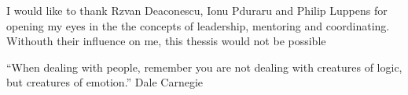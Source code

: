 \vspace*{7cm}
\begin{center}
I would like to thank Rzvan Deaconescu, Ionu Pduraru and Philip Luppens for opening my eyes in the the concepts of leadership, mentoring and coordinating. Withouth their influence on me, this thessis would not be possible
\end{center}
\vspace{0.6cm}
\begin{center}
\begin{displayquote}
``When dealing with people, remember you are not dealing with creatures of logic, but creatures of emotion.'' Dale Carnegie
\end{displayquote}
\end{center}
